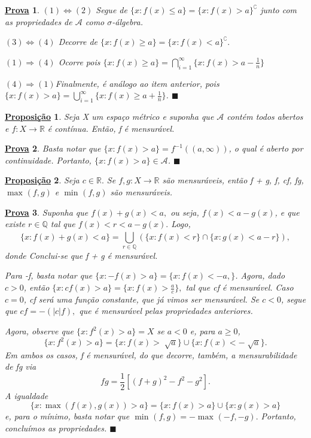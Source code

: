 \documentclass{article}
\newtheorem*{prop*}{\underline{Proposi\c c\~ao}}
\newtheorem*{proof*}{\underline{Prova}}
\renewcommand\qedsymbol{$\blacksquare$}
\begin{document}
\begin{proof*}
  \((1) \Longleftrightarrow (2)\) Segue de \(\{x: f(x) \leq a\} = \{x: f(x) > a\}^{\complement}\) junto com as propriedades de \(\mathcal{A}\) como \(\sigma \)-álgebra.

  \((3) \Longleftrightarrow (4)\) Decorre de \(\{x: f(x) \geq a\} = \{x: f(x) < a\}^{\complement}.\)

  \((1) \Rightarrow (4)\) Ocorre pois \(\{x: f(x)\geq a\} = \bigcap_{i=1}^{\infty}\biggl\{x: f(x) > a - \frac{1}{n}\biggr\}\)

  \((4) \Rightarrow (1)\)Finalmente, é análogo ao item anterior, pois \(\{x: f(x) > a\} = \bigcup_{i=1}^{\infty}\biggl\{x: f(x)\geq a + \frac{1}{n}\biggr\}\). \qedsymbol
\end{proof*}
\begin{prop*}
  Seja X um espaço métrico e suponha que \( \mathcal{A}\) contém todos abertos e \(f:X\rightarrow \mathbb{R}\) é contínua. Então, f é mensurável.
\end{prop*}
\begin{proof*}
  Basta notar que \(\{x: f(x) > a\} = f^{-1}((a, \infty))\), o qual é aberto por continuidade. Portanto, \(\{x: f(x) > a\}\in \mathcal{A}\). \qedsymbol
\end{proof*}
\begin{prop*}
  Seja \(c\in \mathbb{R}.\) Se \(f, g:X\rightarrow \mathbb{R}\) são mensuráveis, então f + g, f, cf, fg, \(\max_{}(f, g)\) e \(\min_{}(f, g)\) são mensuráveis.
\end{prop*}
\begin{proof*}
  Suponha que \(f(x) + g(x) < a,\) ou seja, \(f(x) < a - g(x)\), e que existe \(r\in \mathbb{Q}\) tal que \(f(x) < r < a-g(x).\) Logo,
    \[
      \{x: f(x) + g(x) < a\} = \bigcup_{r\in \mathbb{Q}}^{}(\{x: f(x) < r\}\cap \{x: g(x) < a -r\}),
    \]
  donde Conclui-se que f + g é mensurável. 

  Para -f, basta notar que \(\{x: -f(x) > a\} = \{x: f(x) < -a,\}\). Agora, dado \(c > 0\), então \(\{x: cf(x) > a\} = \{x: f(x) > \frac{a}{c}\},\) tal que cf é mensurável. 
Caso \(c=0\), cf será uma função constante, que já vimos ser mensurável. Se \(c < 0\), segue que \(cf = -(|c|f),\) que é mensurável pelas propriedades anteriores. 

Agora, observe que \(\{x: f^{2}(x) > a\} = X\) se \(a < 0\) e, para \(a \geq 0\),
  \[
    \{x: f^{2}(x) > a\} = \{x: f(x) > \sqrt[]{a}\}\cup \{x: f(x) < -\sqrt[]{a}\}.
  \]
  Em ambos os casos, f é mensurável, do que decorre, também, a mensurabilidade de fg via 
    \[
      fg = \frac{1}{2}[(f+g)^{2} - f^{2}-g^{2}].
    \]
  A igualdade 
    \[
      \{x:\max_{}(f(x), g(x)) > a\} = \{x: f(x) > a\}\cup \{x: g(x) > a\}
    \]
  e, para o mínimo, basta notar que \(\min_{}(f, g) = -\max_{}(-f, -g).\) Portanto, concluímos as propriedades. \qedsymbol
\end{proof*}
\end{document}
